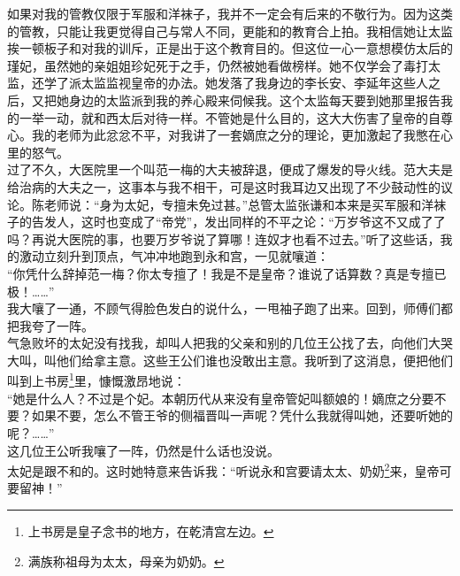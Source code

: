 如果对我的管教仅限于军服和洋袜子，我并不一定会有后来的不敬行为。因为这类的管教，只能让我更觉得自己与常人不同，更能和的教育合上拍。我相信她让太监挨一顿板子和对我的训斥，正是出于这个教育目的。但这位一心一意想模仿太后的瑾妃，虽然她的亲姐姐珍妃死于之手，仍然被她看做榜样。她不仅学会了毒打太监，还学了派太监监视皇帝的办法。她发落了我身边的李长安、李延年这些人之后，又把她身边的太监派到我的养心殿来伺候我。这个太监每天要到她那里报告我的一举一动，就和西太后对待一样。不管她是什么目的，这大大伤害了皇帝的自尊心。我的老师为此忿忿不平，对我讲了一套嫡庶之分的理论，更加激起了我憋在心里的怒气。\\

过了不久，大医院里一个叫范一梅的大夫被辞退，便成了爆发的导火线。范大夫是给治病的大夫之一，这事本与我不相干，可是这时我耳边又出现了不少鼓动性的议论。陈老师说：“身为太妃，专擅未免过甚。”总管太监张谦和本来是买军服和洋袜子的告发人，这时也变成了“帝党”，发出同样的不平之论：“万岁爷这不又成了了吗？再说大医院的事，也要万岁爷说了算哪！连奴才也看不过去。”听了这些话，我的激动立刻升到顶点，气冲冲地跑到永和宫，一见就嚷道：\\

“你凭什么辞掉范一梅？你太专擅了！我是不是皇帝？谁说了话算数？真是专擅已极！……”\\

我大嚷了一通，不顾气得脸色发白的说什么，一甩袖子跑了出来。回到，师傅们都把我夸了一阵。\\

气急败坏的太妃没有找我，却叫人把我的父亲和别的几位王公找了去，向他们大哭大叫，叫他们给拿主意。这些王公们谁也没敢出主意。我听到了这消息，便把他们叫到上书房\footnote{上书房是皇子念书的地方，在乾清宫左边。}里，慷慨激昂地说：\\

“她是什么人？不过是个妃。本朝历代从来没有皇帝管妃叫额娘的！嫡庶之分要不要？如果不要，怎么不管王爷的侧福晋叫一声呢？凭什么我就得叫她，还要听她的呢？……”\\

这几位王公听我嚷了一阵，仍然是什么话也没说。\\

太妃是跟不和的。这时她特意来告诉我：“听说永和宫要请太太、奶奶\footnote{满族称祖母为太太，母亲为奶奶。}来，皇帝可要留神！”\\

